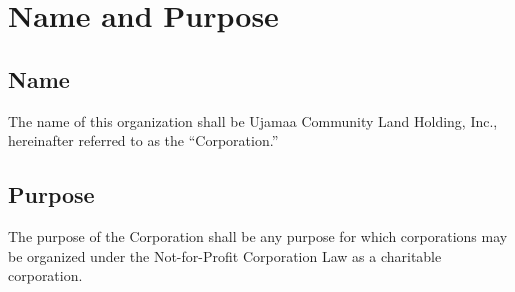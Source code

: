 \section{Name and Purpose}

\subsection{Name}
The name of this organization shall be Ujamaa Community Land Holding,
Inc., hereinafter referred to as the ``Corporation.''

\subsection{Purpose}
The purpose of the Corporation shall be any purpose for which
corporations may be organized under the Not-for-Profit Corporation Law
as a charitable corporation.

